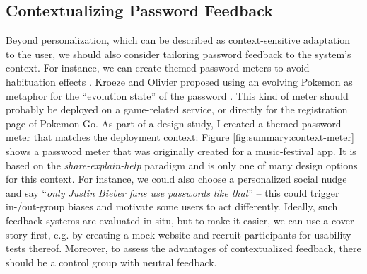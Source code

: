 \subsection{Contextualizing Password Feedback}
Beyond personalization, which can be described as context-sensitive adaptation to the user, we should also consider tailoring password feedback to the system's context. For instance, we can create themed password meters to avoid habituation effects \cite{Ur2012HelpingUsersCreateBetterPasswords}. Kroeze and Olivier proposed using an evolving Pokemon as metaphor for the ``evolution state'' of the password \cite{Kroeze2012GamifyingAuthentication}. This kind of meter should probably be deployed on a game-related service, or directly for the registration page of Pokemon Go. As part of a design study, I created a themed password meter that matches the deployment context: Figure \ref{fig:summary:context-meter} shows a password meter that was originally created for a music-festival app. It is based on the \textit{share-explain-help} paradigm and is only one of many design options for this context. For instance, we could also choose a personalized social nudge and say ``\textit{only Justin Bieber fans use passwords like that}'' -- this could trigger in-/out-group biases and motivate some users to act differently. Ideally, such feedback systems are evaluated in situ, but to make it easier, we can use a cover story first, e.g. by creating a mock-website and recruit participants for usability tests thereof. Moreover, to assess the advantages of contextualized feedback, there should be a control group with neutral feedback.  

